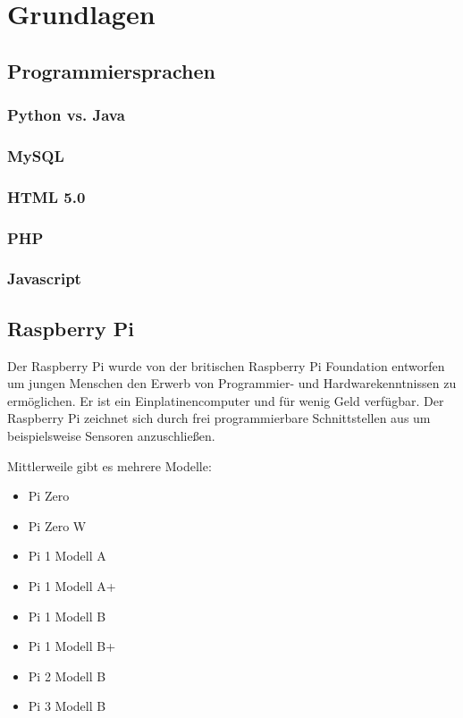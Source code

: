 \chapter{Grundlagen}

\section{Programmiersprachen}

\subsection{Python vs. Java}

\subsection{MySQL}

\subsection{HTML 5.0}

\subsection{PHP}

\subsection{Javascript}

\section{Raspberry Pi}
Der Raspberry Pi wurde von der britischen Raspberry Pi Foundation entworfen um
jungen Menschen den Erwerb von Programmier- und Hardwarekenntnissen zu
ermöglichen. Er ist ein Einplatinencomputer und für wenig Geld verfügbar. Der
Raspberry Pi zeichnet sich durch frei programmierbare Schnittstellen aus um
beispielsweise Sensoren anzuschließen.

 Mittlerweile gibt es mehrere Modelle:

\begin{itemize} 
\item Pi Zero 
\item Pi Zero W
\item Pi 1 Modell A
\item Pi 1 Modell A+
\item Pi 1 Modell B
\item Pi 1 Modell B+
\item Pi 2 Modell B
\item Pi 3 Modell B 
\end{itemize}




